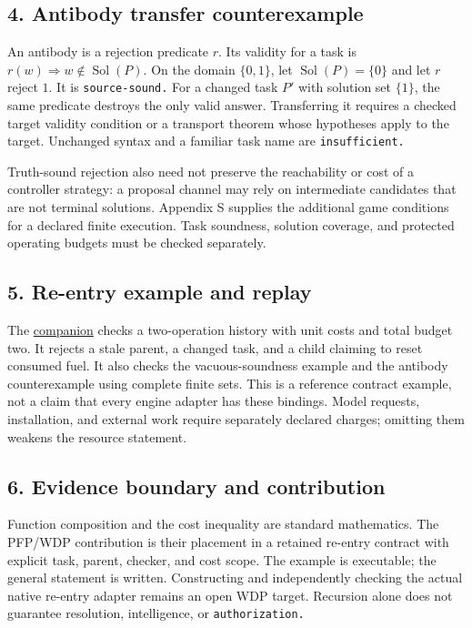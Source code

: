 \documentclass[
  11pt,
]{article}
\begin{document}
\subsection{4. Antibody transfer
counterexample}\label{antibody-transfer-counterexample}

An antibody is a rejection predicate \(r\). Its validity for a task is
\(r(w)\Rightarrow w\notin\operatorname{Sol}(P)\). On the domain
\(\{0,\allowbreak 1\}\), let \(\operatorname{Sol}(P)=\{0\}\) and let
\(r\) reject \(1\). It is \nolinkurl{source-sound.} For a changed task
\(P'\) with solution set \(\{1\}\), the same predicate destroys the only
valid answer. Transferring it requires a checked target validity
condition or a transport theorem whose hypotheses apply to the target.
Unchanged syntax and a familiar task name are \nolinkurl{insufficient.}

Truth-sound rejection also need not preserve the reachability or cost of
a controller strategy: a proposal channel may rely on intermediate
candidates that are not terminal solutions. Appendix S supplies the
additional game conditions for a declared finite execution. Task
soundness, solution coverage, and protected operating budgets must be
checked separately.

\subsection{5. Re-entry example and
replay}\label{re-entry-example-and-replay}

The \href{code/replay.py}{companion} checks a two-operation history with
unit costs and total budget two. It rejects a stale parent, a changed
task, and a child claiming to reset consumed fuel. It also checks the
vacuous-soundness example and the antibody counterexample using complete
finite sets. This is a reference contract example, not a claim that
every engine adapter has these bindings. Model requests, installation,
and external work require separately declared charges; omitting them
weakens the resource statement.

\subsection{6. Evidence boundary and
contribution}\label{evidence-boundary-and-contribution}

Function composition and the cost inequality are standard mathematics.
The PFP/WDP contribution is their placement in a retained re-entry
contract with explicit task, parent, checker, and cost scope. The
example is executable; the general statement is written. Constructing
and independently checking the actual native re-entry adapter remains an
open WDP target. Recursion alone does not guarantee resolution,
intelligence, or \nolinkurl{authorization.}
\end{document}

